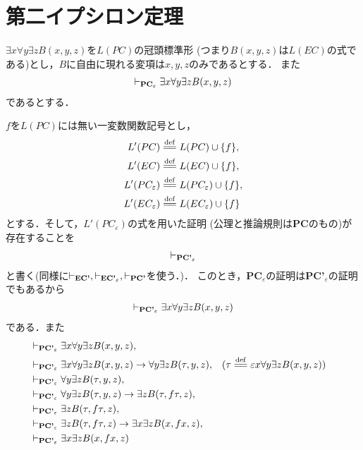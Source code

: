 \section{第二イプシロン定理}
	$\exists x \forall y \exists z B(x,y,z)$を$L(PC)$の冠頭標準形
	(つまり$B(x,y,z)$は$L(EC)$の式である)とし，$B$に自由に現れる変項は$x,y,z$のみであるとする．
	また
	\begin{align}
		\vdash_{{\scriptsize \mbox{{\bf PC}${}_{\varepsilon}$}}} 
		\exists x \forall y \exists z B(x,y,z)
	\end{align}
	であるとする．
	
	$f$を$L(PC)$には無い一変数関数記号とし，
	\begin{align}
		L'(PC) &\defeq L(PC) \cup \{f\}, \\
		L'(EC) &\defeq L(EC) \cup \{f\}, \\
		L'(PC_{\varepsilon}) &\defeq L(PC_{\varepsilon}) \cup \{f\}, \\
		L'(EC_{\varepsilon}) &\defeq L(EC_{\varepsilon}) \cup \{f\}
	\end{align}
	とする．そして，$L'(PC_{\varepsilon})$の式を用いた証明
	(公理と推論規則は{\bf PC}のもの)が存在することを
	\begin{align}
		\vdash_{{\scriptsize \mbox{{\bf PC'}${}_{\varepsilon}$}}}
	\end{align}
	と書く(同様に$\vdash_{{\scriptsize \mbox{{\bf EC'}}}},
	\vdash_{{\scriptsize \mbox{{\bf EC'}${}_{\varepsilon}$}}},
	\vdash_{{\scriptsize \mbox{{\bf PC'}}}}$を使う．)．
	このとき，{\bf PC}${}_{\varepsilon}$の証明は{\bf PC'}${}_{\varepsilon}$の証明でもあるから
	\begin{align}
		\vdash_{{\scriptsize \mbox{{\bf PC'}${}_{\varepsilon}$}}}
		\exists x \forall y \exists z B(x,y,z)
	\end{align}
	である．また
	\begin{align}
		&\provable{\mbox{{\bf PC'}${}_{\varepsilon}$}} \exists x \forall y \exists z B(x,y,z), \\
		&\provable{\mbox{{\bf PC'}${}_{\varepsilon}$}} \exists x \forall y \exists z B(x,y,z)
		\rightarrow \forall y \exists z B(\tau,y,z), && 
		(\tau \defeq \varepsilon x \forall y \exists z B(x,y,z)) \\
		&\provable{\mbox{{\bf PC'}${}_{\varepsilon}$}} \forall y \exists z B(\tau,y,z), \\
		&\provable{\mbox{{\bf PC'}${}_{\varepsilon}$}} \forall y \exists z B(\tau,y,z)
		\rightarrow \exists z B(\tau,f\tau,z), \\
		&\provable{\mbox{{\bf PC'}${}_{\varepsilon}$}} \exists z B(\tau,f\tau,z), \\
		&\provable{\mbox{{\bf PC'}${}_{\varepsilon}$}} \exists z B(\tau,f\tau,z)
		\rightarrow \exists x \exists z B(x,fx,z), \\
		&\provable{\mbox{{\bf PC'}${}_{\varepsilon}$}} \exists x \exists z B(x,fx,z)
	\end{align}
